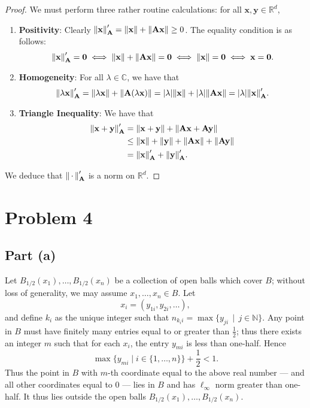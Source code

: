 \documentclass[11pt]{article}
\renewcommand{\vec}[1]{\mathbf{#1}}
\newcommand{\mat}[1]{\mathbf{#1}}
\begin{document}
\begin{proof}
  We must perform three rather routine calculations: for all $\vec{x}, \vec{y} \in \mathbb{R}^{d}$,
  \begin{enumerate}
    \item \textbf{Positivity}: Clearly $\norm{\vec{x}}_{\mat{A}}' = \norm{\vec{x}} + \norm{\mat{A} \vec{x}} \ge 0$. The equality condition is as follows:
    \[
      \norm{\vec{x}}_{\mat{A}}' = \vec{0} \iff \norm{\vec{x}} + \norm{\mat{A} \vec{x}} = \vec{0} \iff \norm{\vec{x}} = \vec{0} \iff \vec{x} = \vec{0}.
    \]
    \item \textbf{Homogeneity}: For all $\lambda \in \mathbb{C}$, we have that
    \[
      \norm{\lambda \vec{x}}_{\mat{A}}' = \norm{\lambda \vec{x}} + \norm{\mat{A} (\lambda \vec{x})} = \abs{\lambda} \norm{\vec{x}} + \abs{\lambda} \norm{\mat{A} \vec{x}} = \abs{\lambda} \norm{\vec{x}}_{\mat{A}}'.
    \]
    \item \textbf{Triangle Inequality}: We have that
    \begin{align*}
      \norm{\vec{x} + \vec{y}}_{\mat{A}}' & = \norm{\vec{x} + \vec{y}} + \norm{\mat{A} \vec{x} + \mat{A} \vec{y}} \\
                                          & \le \norm{\vec{x}} + \norm{\vec{y}} + \norm{\mat{A} \vec{x}} + \norm{\mat{A} \vec{y}} \\
                                          & = \norm{\vec{x}}_{\mat{A}}' + \norm{\vec{y}}_{\mat{A}}'.
    \end{align*}
  \end{enumerate}
  We deduce that $\norm{\, \cdot \,}_{\mat{A}}'$ is a norm on $\mathbb{R}^{d}$.
\end{proof}


\section{Problem 4}


\subsection{Part (a)}

Let $B_{1/2}(x_{1}), \ldots, B_{1/2}(x_{n})$ be a collection of open balls which cover $B$; without loss of generality, we may assume $x_{1}, \ldots, x_{n} \in B$. Let
\[
  x_{i} = (y_{1i}, y_{2i}, \ldots),
\]
and define $k_{i}$ as the unique integer such that $n_{k_{i}i} = \max \{ y_{ji} \, \mid \, j \in \mathbb{N} \}$. Any point in $B$ must have finitely many entries equal to or greater than $\tfrac{1}{2}$; thus there exists an integer $m$ such that for each $x_{i}$, the entry $y_{mi}$ is less than one-half. Hence
\[
  \max \{ y_{mi} \mid i \in \{ 1, \ldots, n \} \} + \frac{1}{2} < 1.
\]
Thus the point in $B$ with $m$-th coordinate equal to the above real number --- and all other coordinates equal to $0$ --- lies in $B$ and has $\ell_{\infty}$ norm greater than one-half. It thus lies outside the open balls $B_{1/2}(x_{1}), \ldots, B_{1/2}(x_{n})$.
\end{document}
